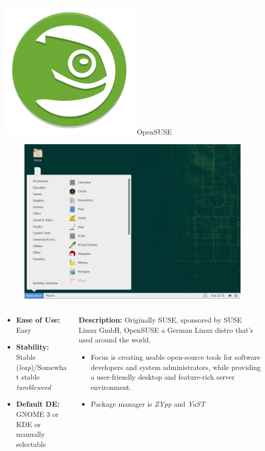 \documentclass[11pt]{beamer}
\begin{document}
\begin{frame}{\includegraphics[scale=0.07]{opensuse-logo.png} OpenSUSE}
	\begin{figure}
		\includegraphics[scale=0.15]{opensuse-screenshot.png}
	\end{figure}
	\begin{columns}
		\small
		\begin{column}{0.35\textwidth}
			\begin{itemize}
				\item \textbf{Ease of Use:} Easy
				\item \textbf{Stability:} Stable (\textit{leap})/Somewhat stable \textit{tumbleweed}
				\item \textbf{Default DE:} GNOME 3 or KDE or manually selectable
			\end{itemize}
		\end{column}
		\begin{column}{0.65\textwidth}
			\small
			\textbf{Description:}  Originally SUSE, sponsored by SUSE Linux GmbH, OpenSUSE a German Linux distro that's used around the world.
			\begin{itemize}
				\item Focus is creating usable open-source tools for software developers and system administrators, while providing a user-friendly desktop and feature-rich server environment.
				\item Package manager is \textit{ZYpp} and \textit{YaST}
			\end{itemize}
		\end{column}
	\end{columns}
\end{frame}
\end{document}
